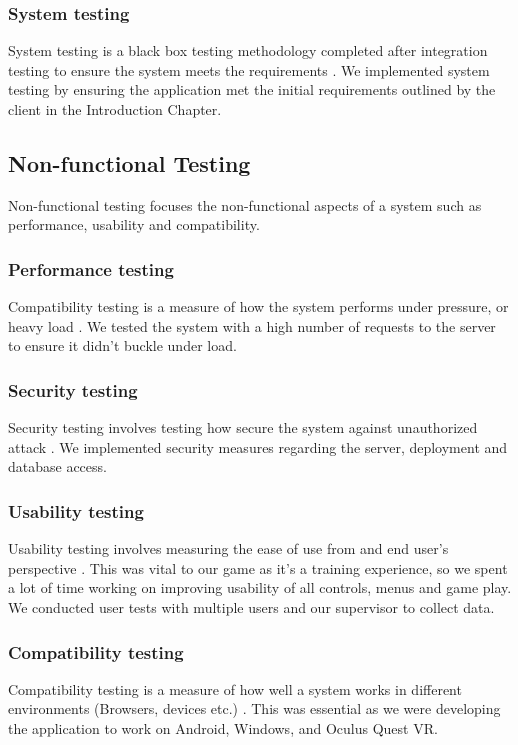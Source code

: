 \subsubsection{System testing}
System testing is a black box testing methodology completed after integration testing to ensure the system meets the requirements \cite{1028373}. We implemented system testing by ensuring the application met the initial requirements outlined by the client in the Introduction Chapter.

\subsection{Non-functional Testing}
Non-functional testing focuses the non-functional aspects of a system such as performance, usability and compatibility.

\subsubsection{Performance testing}
Compatibility testing is a measure of how the system performs under pressure, or heavy load \cite{1028373}. We tested the system with a high number of requests to the server to ensure it didn't buckle under load.

\subsubsection{Security testing}
Security testing involves testing how secure the system against unauthorized attack \cite{1028373}. We implemented security measures regarding the server, deployment and database access.

\subsubsection{Usability testing}
Usability testing involves measuring the ease of use from and end user’s perspective \cite{5380492}. This was vital to our game as it's a training experience, so we spent a lot of time working on improving usability of all controls, menus and game play. We conducted user tests with multiple users and our supervisor to collect data.

\subsubsection{Compatibility testing}
Compatibility testing is a measure of how well a system works in different environments (Browsers, devices etc.) \cite{5380492}. This was essential as we were developing the application to work on Android, Windows, and Oculus Quest VR.

